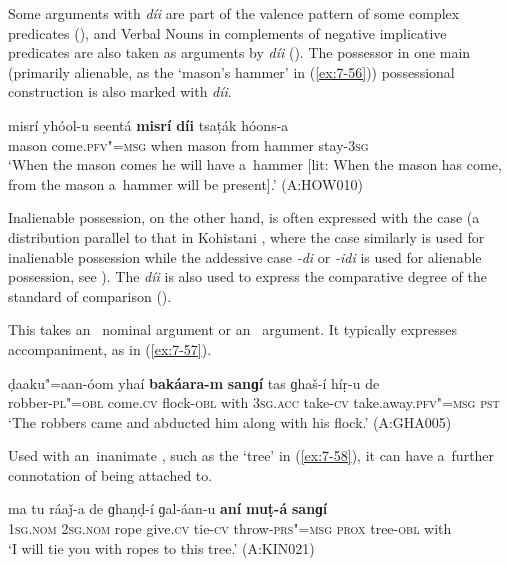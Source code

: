 Some arguments with \textit{díi} are part of the valence pattern of some complex predicates (), and Verbal Nouns in complements of negative implicative predicates are also taken as arguments by \textit{díi} (). The possessor in one main (primarily alienable, as the `mason's hammer' in (\ref{ex:7-56})) possessional construction is also marked with \textit{díi}.

\begin{exe}
\ex
\label{ex:7-56}
\gll misrí yhóol-u seentá \textbf{misrí} \textbf{díi} tsaṭák hóons-a \\
mason come.\textsc{pfv"=msg} when mason from hammer stay-\textsc{3sg} \\
\glt `When the mason comes he will have a~hammer [lit: When the mason has come, from the mason a~hammer will be present].'  (A:HOW010)
\end{exe}

Inalienable possession, on the other hand, is often expressed with the  case (a distribution parallel to that in Kohistani \iliShina, where the  case similarly is used for inalienable possession while the addessive case \textit{-di} or \textit{-idi} is used for alienable possession, see \citealt[65, 69--70]{schmidtkohistani2008}). The  \textit{díi} is also used to express the comparative degree of the standard of comparison ().


 This  takes an~ nominal argument or an~  argument. It typically expresses accompaniment, as in (\ref{ex:7-57}).

\ea
\label{ex:7-57}
\gll ḍaaku"=aan-óom yhaí \textbf{bakáara-m} \textbf{sanɡí} tas ɡhaš-í híṛ-u de \\
robber-\textsc{pl"=obl} come.\textsc{cv} flock-\textsc{obl}  with \textsc{3sg.acc} take-\textsc{cv} take.away.\textsc{pfv"=msg} \textsc{pst} \\
\glt `The robbers came and abducted him along with his flock.' (A:GHA005)
\z

Used with an~inanimate , such as the `tree' in (\ref{ex:7-58}), it can have a~further connotation of being attached to.

\begin{exe}
\ex
\label{ex:7-58}
\gll ma tu ráaǰ-a de ɡhaṇḍ-í ɡal-áan-u \textbf{aní} \textbf{muṭ-á} \textbf{sanɡí} \\
\textsc{1sg.nom} \textsc{2sg.nom} rope give.\textsc{cv} tie-\textsc{cv} throw-\textsc{prs"=msg} \textsc{prox} tree-\textsc{obl} with \\
\glt `I will tie you with ropes to this tree.' (A:KIN021)
\end{exe}

